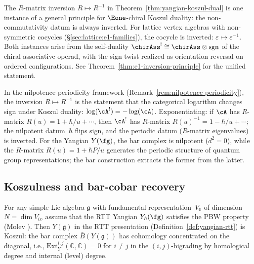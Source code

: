 \begin{remark}
\label{rem:yangian-e1-inversion}
The $R$-matrix inversion $R \mapsto R^{-1}$ in
Theorem~\ref{thm:yangian-koszul-dual} is one instance of a
general principle for $\Eone$-chiral Koszul duality: the
non-commutativity datum is always inverted.  For lattice
vertex algebras with non-symmetric cocycles
(\S\ref{sec:lattice:e1-families}), the cocycle is inverted:
$\varepsilon \mapsto \varepsilon^{-1}$.  Both instances arise from
the self-duality ${\chirAss}^! \cong \chirAss \otimes \mathrm{sgn}$
of the chiral associative operad, with the sign twist realized as
orientation reversal on ordered configurations.  See
Theorem~\ref{thm:e1-inversion-principle} for the unified
statement.

In the nilpotence-periodicity framework
(Remark~\ref{rem:nilpotence-periodicity}), the inversion
$R \mapsto R^{-1}$ is the statement that the categorical logarithm
changes sign under Koszul duality: $\log(\cA^!) = -\log(\cA)$.
Exponentiating: if $\cA$ has $R$-matrix $R(u) = 1 + \hbar/u + \cdots$,
then $\cA^!$ has $R$-matrix $R(u)^{-1} = 1 - \hbar/u + \cdots$; the
nilpotent datum~$\hbar$ flips sign, and the periodic datum
($R$-matrix eigenvalues) is inverted.  For the Yangian $Y(\fg)$, the
bar complex is nilpotent ($d^2 = 0$), while the $R$-matrix
$R(u) = 1 + \hbar P/u$ generates the periodic structure of quantum
group representations; the bar construction extracts the former from
the latter.
\end{remark}

\subsection{Koszulness and bar-cobar recovery}

\begin{proposition}\label{prop:yangian-koszul}
For any simple Lie algebra $\mathfrak{g}$ with fundamental
representation~$V_0$ of dimension~$N = \dim V_0$, assume that
the RTT Yangian $Y_{\hbar}(\fg)$ satisfies the PBW property
\textup{(}Molev \cite{molev-yangians}\textup{)}.
Then $Y(\mathfrak{g})$ in the RTT presentation
(Definition~\ref{def:yangian-rtt}) is Koszul: the bar complex
$\bar{B}(Y(\mathfrak{g}))$ has cohomology concentrated on the
diagonal, i.e., $\mathrm{Ext}^{i,j}_{Y}(\mathbb{C}, \mathbb{C}) = 0$
for $i \neq j$ in the $(i, j)$-bigrading by homological degree and
internal (level) degree.
\end{proposition}

